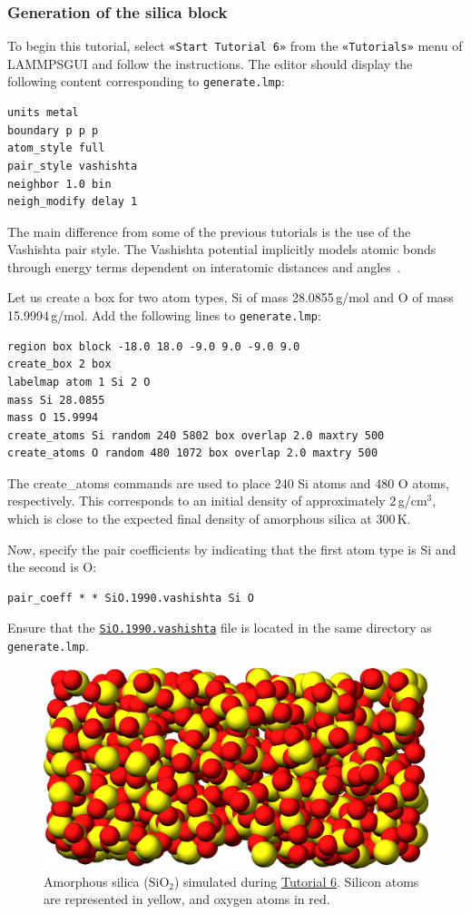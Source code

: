 \documentclass[9pt,tutorial]{livecoms}
\newcommand{\lmpcmd}[1]{\hspace{0pt}\colorbox{listing}{\textcolor{command}{\small{#1}}}\hspace{0pt}} %
\newcommand{\flecmd}[1]{\textcolor{command}{\texttt{#1}}} %
\newcommand{\guicmd}[1]{\textcolor{command}{\texttt{«#1»}}} %
\newcommand{\dwlcmd}[1]{\textcolor{download}{\texttt{#1}}} %
\newcommand{\lammpsgui}{\textsf{LAMMPS\textendash GUI}}
\newcommand{\filepath}{https://raw.githubusercontent.com/lammpstutorials/lammpstutorials-article/main/files/}
\begin{document}
\subsubsection{Generation of the silica block}

To begin this tutorial, select \guicmd{Start Tutorial 6} from the
\guicmd{Tutorials} menu of \lammpsgui{} and follow the instructions.
The editor should display the following content corresponding to \flecmd{generate.lmp}:
\begin{lstlisting}
units metal
boundary p p p
atom_style full
pair_style vashishta
neighbor 1.0 bin
neigh_modify delay 1
\end{lstlisting}
The main difference from some of the previous tutorials is the use of the \lmpcmd{Vashishta}
pair style.  The Vashishta potential implicitly models atomic bonds through
energy terms dependent on interatomic distances and angles~\cite{vashishta1990interaction}.

Let us create a box for two atom types, \lmpcmd{Si}
of mass 28.0855\,g/mol and \lmpcmd{O} of mass 15.9994\,g/mol.
Add the following lines to \flecmd{generate.lmp}:
\begin{lstlisting}
region box block -18.0 18.0 -9.0 9.0 -9.0 9.0
create_box 2 box
labelmap atom 1 Si 2 O
mass Si 28.0855
mass O 15.9994
create_atoms Si random 240 5802 box overlap 2.0 maxtry 500
create_atoms O random 480 1072 box overlap 2.0 maxtry 500
\end{lstlisting}
The \lmpcmd{create\_atoms} commands are used to place
240 Si atoms and 480 O atoms, respectively.  This corresponds to
an initial density of approximately $2$\,g/cm$^3$, which is close
to the expected final density of amorphous silica at 300\,K.

Now, specify the pair coefficients by indicating that the first atom type
is \lmpcmd{Si} and the second is \lmpcmd{O}:
\begin{lstlisting}
pair_coeff * * SiO.1990.vashishta Si O
\end{lstlisting}
Ensure that the \href{\filepath tutorial6/SiO.1990.vashishta}{\dwlcmd{SiO.1990.vashishta}}
file is located in the same directory as \flecmd{generate.lmp}.

\begin{figure}
\centering
\includegraphics[width=0.9\linewidth]{GCMC-generate}
\caption{Amorphous silica ($\text{SiO}_2$) simulated
during \hyperref[gcmc-silica-label]{Tutorial 6}.  Silicon atoms are
represented in yellow, and oxygen atoms in red.}
\label{fig:GCMC-snapshot}
\end{figure}
\end{document}
